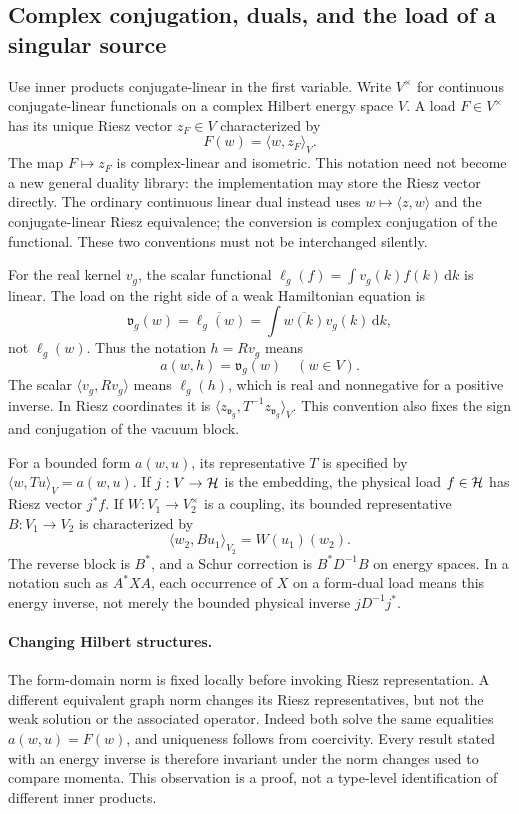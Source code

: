 \documentclass[11pt,a4paper]{article}
\theoremstyle{remark}\newtheorem{remark}[theorem]{Remark}
\newcommand{\ip}[2]{\langle #1,#2\rangle}\newcommand{\norm}[1]{\lVert #1\rVert}
\newcommand{\dd}{\,\mathrm d}\newcommand{\almosteverywhere}{\text{a.e.}}
\begin{document}
\subsection{Complex conjugation, duals, and the load of a singular source}\label{sec:dualconventions}
Use inner products conjugate-linear in the first variable. Write $V^{\times}$ for continuous conjugate-linear functionals on a complex Hilbert energy space $V$. A load $F\in V^{\times}$ has its unique Riesz vector $z_F\in V$ characterized by
\[
 F(w)=\ip w{z_F}_V.
\]
The map $F\mapsto z_F$ is complex-linear and isometric. This notation need not become a new general duality library: the implementation may store the Riesz vector directly. The ordinary continuous linear dual instead uses $w\mapsto\ip{z}{w}$ and the conjugate-linear Riesz equivalence; the conversion is complex conjugation of the functional. These two conventions must not be interchanged silently.

For the real kernel $v_g$, the scalar functional
$\ell_g(f)=\int v_g(k)f(k)\dd k$ is linear. The load on the right side of a weak Hamiltonian equation is
\[
 \mathfrak v_g(w)=\overline{\ell_g(w)}
           =\int\overline{w(k)}v_g(k)\dd k,
\]
not $\ell_g(w)$. Thus the notation $h=Rv_g$ means
\[
 a(w,h)=\mathfrak v_g(w)\quad(w\in V).
\]
The scalar $\ip{v_g}{Rv_g}$ means $\ell_g(h)$, which is real and nonnegative for a positive inverse. In Riesz coordinates it is $\ip{z_{\mathfrak v_g}}{T^{-1}z_{\mathfrak v_g}}_V$. This convention also fixes the sign and conjugation of the vacuum block.

For a bounded form $a(w,u)$, its representative $T$ is specified by
$\ip w{Tu}_V=a(w,u)$. If $j:V\to\mathcal H$ is the embedding, the physical load $f\in\mathcal H$ has Riesz vector $j^*f$. If $W:V_1\to V_2^{\times}$ is a coupling, its bounded representative $B:V_1\to V_2$ is characterized by
\[
 \ip{w_2}{Bu_1}_{V_2}=W(u_1)(w_2).
\]
The reverse block is $B^*$, and a Schur correction is $B^*D^{-1}B$ on energy spaces. In a notation such as $A^*XA$, each occurrence of $X$ on a form-dual load means this energy inverse, not merely the bounded physical inverse $jD^{-1}j^*$.

\paragraph{Changing Hilbert structures.}
The form-domain norm is fixed locally before invoking Riesz representation. A different equivalent graph norm changes its Riesz representatives, but not the weak solution or the associated operator. Indeed both solve the same equalities $a(w,u)=F(w)$, and uniqueness follows from coercivity. Every result stated with an energy inverse is therefore invariant under the norm changes used to compare momenta. This observation is a proof, not a type-level identification of different inner products.
\end{document}
